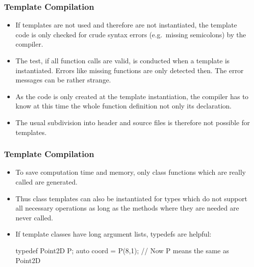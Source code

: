 \documentclass[aspectratio=169,ignorenonframetext,11pt]{beamer}
\begin{document}
\begin{frame}[fragile]
\frametitle{Template Compilation}
\begin{itemize}
\item If templates are not used and therefore are not instantiated, the template code is only
checked for crude syntax errors (e.g.~missing semicolons) by the compiler.
\item The test, if all function calls are valid, is conducted when a template is instantiated.
Errors like missing functions are only detected then. The error messages can be rather strange.
\item As the code is only created at the template instantiation, the compiler has to know at this
time the whole function definition not only its declaration.
\item The usual subdivision into header and source files is therefore not possible for templates.
\end{itemize}
\end{frame}


\begin{frame}[fragile]
\frametitle<presentation>{Template Compilation}
\begin{itemize}
\item To save computation time and memory, only class functions which are really called are generated.
\item Thus
class templates can also be instantiated for types which do not support all necessary operations as long
as the methods where they are needed are never called.
\item If template classes have long argument lists, typedefs are helpful:
\begin{cppcode}
typedef Point2D P;
auto coord = P(8,1); // Now P means the same as Point2D
\end{cppcode}

\end{itemize}
\end{frame}
\end{document}
